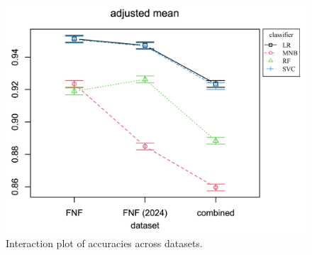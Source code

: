 \begin{figure}[h!]
    \centering
    \includegraphics[width=\textwidth,height=\textheight, keepaspectratio]{figures/stats/im.png}
        \caption{Interaction plot of accuracies across datasets.}
        \label{fig:interaction_plot}
\end{figure}


